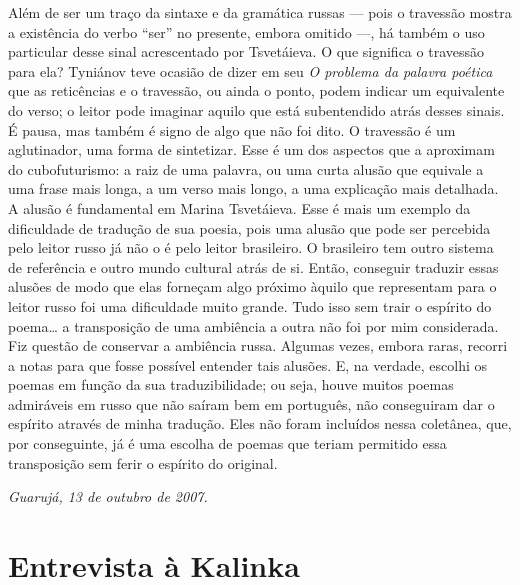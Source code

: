 Além de ser um traço da sintaxe e da gramática russas ---
pois o travessão mostra a existência do verbo ``ser'' no presente,
embora omitido ---, há também o uso particular desse sinal acrescentado
por Tsvetáieva. O que significa o travessão para ela? Tyniánov teve
ocasião de dizer em seu \emph{O problema da palavra poética} que as
reticências e o travessão, ou ainda o ponto, podem indicar um
equivalente do verso; o leitor pode imaginar aquilo que está
subentendido atrás desses sinais. É pausa, mas também é signo de algo
que não foi dito. O travessão é um aglutinador, uma forma de sintetizar.
Esse é um dos aspectos que a aproximam do cubofuturismo: a raiz de uma
palavra, ou uma curta alusão que equivale a uma frase mais longa, a um
verso mais longo, a uma explicação mais detalhada. A alusão é
fundamental em Marina Tsvetáieva. Esse é mais um exemplo da dificuldade
de tradução de sua poesia, pois uma alusão que pode ser percebida pelo
leitor russo já não o é pelo leitor brasileiro. O brasileiro tem outro
sistema de referência e outro mundo cultural atrás de si. Então,
conseguir traduzir essas alusões de modo que elas forneçam algo próximo
àquilo que representam para o leitor russo foi uma dificuldade muito
grande. Tudo isso sem trair o espírito do poema\ldots{} a transposição de uma
ambiência a outra não foi por mim considerada. Fiz questão de conservar
a ambiência russa. Algumas vezes, embora raras, recorri a notas para que
fosse possível entender tais alusões. E, na verdade, escolhi os poemas
em função da sua traduzibilidade; ou seja, houve muitos poemas
admiráveis em russo que não saíram bem em português, não conseguiram dar
o espírito através de minha tradução. Eles não foram incluídos nessa
coletânea, que, por conseguinte, já é uma escolha de poemas que teriam
permitido essa transposição sem ferir o espírito do original.

\begin{flushright}
\emph{Guarujá, 13 de outubro de 2007.}
\end{flushright}


\chapter{Entrevista à Kalinka}
\label{kalinka}

